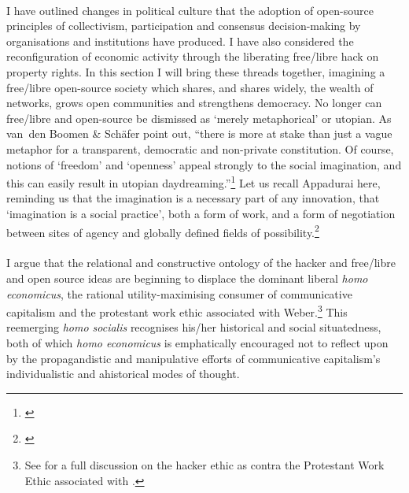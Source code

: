 \documentclass[11pt,titlepage]{book}
\begin{document}
\paragraph{}I have outlined changes in political culture that the adoption of open-source principles of collectivism, participation and consensus decision-making by organisations and institutions have produced. I have also considered the reconfiguration of economic activity through the liberating free/libre hack on property rights. In this section I will bring these threads together, imagining a free/libre open-source society which shares, and shares widely, the wealth of networks, grows open communities and strengthens democracy. No longer can free/libre and open-source be dismissed as ‘merely metaphorical’ or utopian. As van~den Boomen \& Sch{\"a}fer point out, ``there is more at stake than just a vague metaphor for a transparent, democratic and non-private constitution. Of course, notions of ‘freedom’ and ‘openness’ appeal strongly to the social imagination, and this can easily result in utopian daydreaming.''\footnote{\cite[p. 7]{Boomen:2005uq}} Let us recall Appadurai here, reminding us that the imagination is a necessary part of any innovation, that `imagination is a social practice', both a form of work, and a form of negotiation between sites of agency and globally defined fields of possibility.\footnote{\cite[p. 31]{Appadurai:1996lp}}

\paragraph{}I argue that the relational and constructive ontology of the hacker and free/libre and open source ideas are beginning to displace the dominant liberal \textit{homo economicus}, the rational utility-maximising consumer of communicative capitalism and the protestant work ethic associated with Weber.\footnote{See \cite[Ch. 1 \& 2]{himanen:2001he} for a full discussion on the hacker ethic as contra the Protestant Work Ethic associated with \cite{weber:1958}.} This reemerging \textit{homo socialis} recognises his/her historical and social situatedness, both of  which \textit{homo economicus} is emphatically encouraged not to reflect upon by the propagandistic and manipulative efforts of communicative capitalism's individualistic and ahistorical modes of thought.
\end{document}

